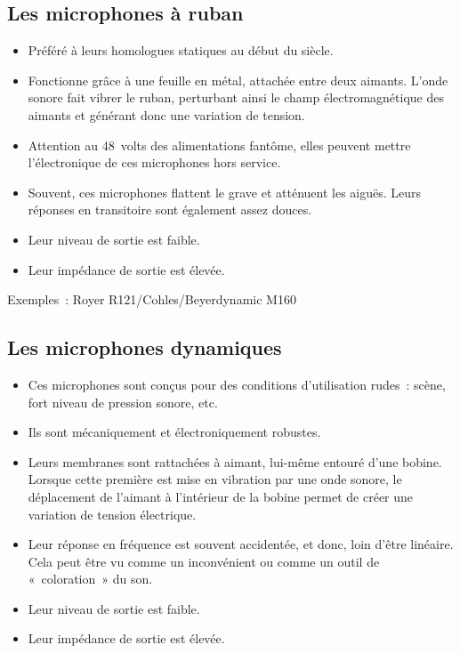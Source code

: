 \documentclass[
]{book}
\providecommand{\tightlist}{%
  \setlength{\itemsep}{0pt}\setlength{\parskip}{0pt}}
\begin{document}
\hypertarget{les-microphones-uxe0-ruban}{%
\subsection{Les microphones à ruban}\label{les-microphones-uxe0-ruban}}

\begin{itemize}
\tightlist
\item
  Préféré à leurs homologues statiques au début du siècle.
\item
  Fonctionne grâce à une feuille en métal, attachée entre deux aimants. L'onde sonore fait vibrer le ruban, perturbant ainsi le champ électromagnétique des aimants et générant donc une variation de tension.
\item
  Attention au 48~volts des alimentations fantôme, elles peuvent mettre l'électronique de ces microphones hors service.
\item
  Souvent, ces microphones flattent le grave et atténuent les aiguës. Leurs réponses en transitoire sont également assez douces.
\item
  Leur niveau de sortie est faible.
\item
  Leur impédance de sortie est élevée.
\end{itemize}

Exemples~: Royer R121/Cohles/Beyerdynamic M160

\hypertarget{les-microphones-dynamiques}{%
\subsection{Les microphones dynamiques}\label{les-microphones-dynamiques}}

\begin{itemize}
\tightlist
\item
  Ces microphones sont conçus pour des conditions d'utilisation rudes~: scène, fort niveau de pression sonore, etc.
\item
  Ils sont mécaniquement et électroniquement robustes.
\item
  Leurs membranes sont rattachées à aimant, lui-même entouré d'une bobine. Lorsque cette première est mise en vibration par une onde sonore, le déplacement de l'aimant à l'intérieur de la bobine permet de créer une variation de tension électrique.
\item
  Leur réponse en fréquence est souvent accidentée, et donc, loin d'être linéaire. Cela peut être vu comme un inconvénient ou comme un outil de «~coloration~» du son.
\item
  Leur niveau de sortie est faible.
\item
  Leur impédance de sortie est élevée.
\end{itemize}
\end{document}
